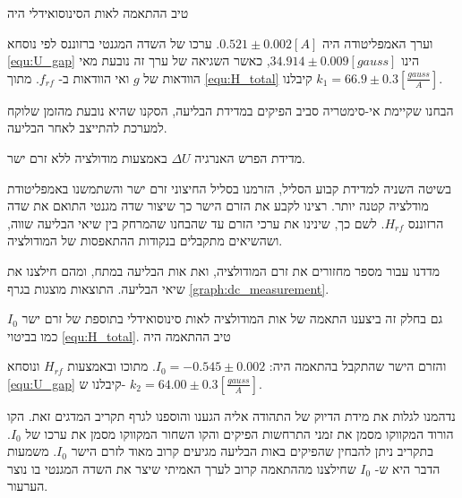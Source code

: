 \documentclass{article}
\begin{document}
טיב ההתאמה לאות הסינוסואידלי היה

וערך האמפליטודה היה
$0.521\pm0.002 [A]$.
ערכו של השדה המגנטי ברזוננס לפי נוסחא
\ref{equ:U_gap}
הינו
$34.914\pm0.009 [gauss]$,
כאשר השגיאה של ערך זה נובעת מאי הוודאות של
$g$
ואי הוודאות ב-
$f_{rf}$.
מתוך
\ref{equ:H_total}
קיבלנו
$k_1 = 66.9\pm 0.3 [\frac{gauss}{A}]$.

הבחנו שקיימת אי-סימטריה סביב הפיקים במדידת הבליעה, הסקנו שהיא נובעת מהזמן שלוקח למערכת להתייצב לאחר הבליעה.
\begin{graph}[H]
	\begin{center}
	\resizebox{\textwidth}{!}{}
	\end{center}
	\caption{
	מדידת הפרש האנרגיה
	$\Delta U$
	באמצעות מודולציה ללא זרם ישר.
	}
\label{graph:p2p_measurement}
\end{graph}
\clearpage


בשיטה השניה למדידת קבוע הסליל,  הזרמנו בסליל החיצוני זרם ישר והשתמשנו באמפליטודת מודלציה קטנה יותר.
רצינו לקבע את הזרם הישר כך שיצור שדה מגנטי התואם את שדה הרזוננס
$H_{rf}$.
לשם כך, שינינו את ערכי הזרם עד שהבחנו שהמרחק בין שיאי הבליעה שווה, ושהשיאים מתקבלים בנקודות ההתאפסות של המודולציה.

מדדנו עבור מספר מחזורים את זרם המודולציה,
ואת אות הבליעה במתח, ומהם חילצנו את שיאי הבליעה. התוצאות מוצגות בגרף
\ref{graph:dc_measurement}.

\begin{graph}[H]
	\begin{center}
	\resizebox{\textwidth}{!}{}
	\end{center}
	\caption{
	המתח על הסליל החיצוני כתלות בזמן, בזמן בליעה, עבור זרם ישר המוזרם בסליל החיצוני
	}
\label{graph:dc_measurement}
\end{graph}

גם בחלק זה ביצענו התאמה של אות המודולציה לאות סינוסואידלי בתוספת של זרם ישר
$I_0$
כמו בביטוי
\ref{equ:H_total}.
טיב ההתאמה היה 

והזרם הישר שהתקבל בהתאמה היה:
$I_0 = -0.545 \pm 0.002$.
מתוכו ובאמצעות
$H_{rf}$
ונוסחא
\ref{equ:U_gap}
קיבלנו ש-
$k_2 = 64.00 \pm 0.3 [\frac{gauss}{A}]$.

נדהמנו לגלות את מידת הדיוק של התהודה אליה הגענו והוספנו לגרף תקריב המדגים זאת. הקו הורוד המקווקו מסמן את זמני התרחשות הפיקים והקו השחור המקווקו מסמן את ערכו של
$I_0$.
בתקריב ניתן להבחין שהפיקים באות הבליעה מגיעים קרוב מאוד לזרם הישר
$I_0$.
משמעות הדבר היא ש-
$I_0$
שחילצנו מההתאמה קרוב לערך האמיתי שיצר את השדה המגנטי בו נוצר הערעור.
\end{document}
